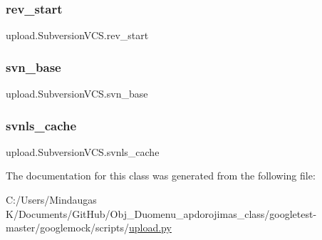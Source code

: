 \mbox{\label{classupload_1_1_subversion_v_c_s_ad1553a69f4a790309273dbdeb9077732}} 
\subsubsection{\texorpdfstring{rev\_start}{rev\_start}}
{\footnotesize\ttfamily upload.\+Subversion\+V\+C\+S.\+rev\+\_\+start}

\mbox{\label{classupload_1_1_subversion_v_c_s_a60645c40d2fea4cd52881576bd13341f}} 
\subsubsection{\texorpdfstring{svn\_base}{svn\_base}}
{\footnotesize\ttfamily upload.\+Subversion\+V\+C\+S.\+svn\+\_\+base}

\mbox{\label{classupload_1_1_subversion_v_c_s_aa801782f807674b06f491df5d7ca9942}} 
\subsubsection{\texorpdfstring{svnls\_cache}{svnls\_cache}}
{\footnotesize\ttfamily upload.\+Subversion\+V\+C\+S.\+svnls\+\_\+cache}



The documentation for this class was generated from the following file\+:\begin{DoxyCompactItemize}
\item 
C\+:/\+Users/\+Mindaugas K/\+Documents/\+Git\+Hub/\+Obj\+\_\+\+Duomenu\+\_\+apdorojimas\+\_\+class/googletest-\/master/googlemock/scripts/\mbox{\hyperlink{googletest-master_2googlemock_2scripts_2upload_8py}{upload.\+py}}\end{DoxyCompactItemize}
